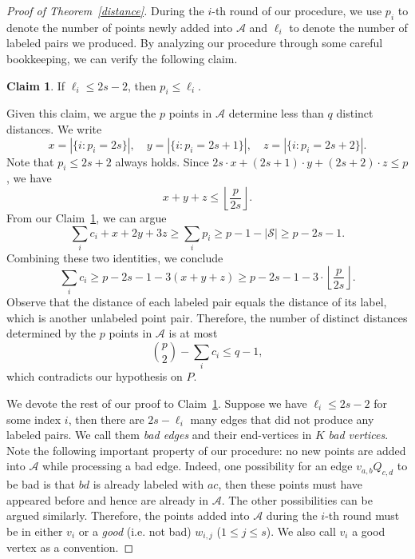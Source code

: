 \documentclass[11pt]{article}
\theoremstyle{definition}
\newtheorem{claim}[theorem]{Claim}
\begin{document}
\begin{proof}[Proof of Theorem~\ref{distance}]
During the $i$-th round of our procedure, we use $p_i$ to denote the number of points newly added into $\mathcal{A}$ and $\ell_i$ to denote the number of labeled pairs we produced. By analyzing our procedure through some careful bookkeeping, we can verify the following claim.
\begin{claim}\label{claim_distance}
    If $\ell_i \leq 2s - 2$, then $p_i \leq \ell_i$.
\end{claim} Given this claim, we argue the $p$ points in $\mathcal{A}$ determine less than $q$ distinct distances. We write \begin{equation*}
    x  = |\{i : p_i = 2s\}|,\quad y  = |\{i : p_i = 2s+1\}|,\quad z  = |\{i : p_i = 2s+2\}|.
\end{equation*} Note that $p_i \leq 2s+2$ always holds. Since $2s \cdot x + (2s + 1) \cdot y + (2s + 2) \cdot z \leq p$, we have\begin{equation*}
    x + y + z \leq \left\lfloor \frac{p}{2s} \right\rfloor.
\end{equation*} From our Claim~\ref{claim_distance}, we can argue
\begin{equation*}
    \sum_{i}c_i + x + 2y + 3z \geq \sum_i p_i \geq p - 1 - |\mathcal{S}| \geq p - 2s -1.
\end{equation*} Combining these two identities, we conclude
\begin{equation*}
    \sum_i c_i \geq p - 2s -1 - 3(x + y + z) \geq p - 2s - 1 - 3 \cdot \left\lfloor \frac{p}{2s} \right\rfloor.
\end{equation*} Observe that the distance of each labeled pair equals the distance of its label, which is another unlabeled point pair. Therefore, the number of distinct distances determined by the $p$ points in $\mathcal{A}$ is at most \begin{equation*}
    \binom{p}{2} - \sum_i c_i \leq q - 1,
\end{equation*} which contradicts our hypothesis on $P$.

\medskip

We devote the rest of our proof to Claim~\ref{claim_distance}. Suppose we have $\ell_i \leq 2s - 2$ for some index $i$, then there are $2s - \ell_i$ many edges that did not produce any labeled pairs. We call them \textit{bad edges} and their end-vertices in $K$ \textit{bad vertices}. Note the following important property of our procedure: no new points are added into $\mathcal{A}$ while processing a bad edge. Indeed, one possibility for an edge $v_{a,b}Q_{c,d}$ to be bad is that $bd$ is already labeled with $ac$, then these points must have appeared before and hence are already in $\mathcal{A}$. The other possibilities can be argued similarly. Therefore, the points added into $\mathcal{A}$ during the $i$-th round must be in either $v_i$ or a \textit{good} (i.e. not bad) $w_{i,j}$ ($1\leq j\leq s$). We also call $v_i$ a good vertex as a convention.


\end{proof}
\end{document}
